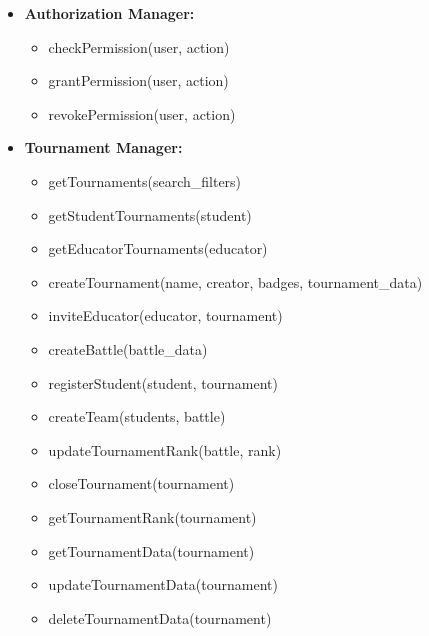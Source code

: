\begin{itemize}
    \item \textbf{Authorization Manager:}
    \begin{itemize}
        \item checkPermission(user, action)
        \item grantPermission(user, action)
        \item revokePermission(user, action)
    \end{itemize}

    \item \textbf{Tournament Manager:}
    \begin{itemize}
        \item getTournaments(search\_filters)
        \item getStudentTournaments(student)
        \item getEducatorTournaments(educator)
        \item createTournament(name, creator, badges, tournament\_data)
        \item inviteEducator(educator, tournament)
        \item createBattle(battle\_data)
        \item registerStudent(student, tournament)
        \item createTeam(students, battle)
        \item updateTournamentRank(battle, rank)
        \item closeTournament(tournament)
        \item getTournamentRank(tournament)
        \item getTournamentData(tournament)
        \item updateTournamentData(tournament)
        \item deleteTournamentData(tournament)
    \end{itemize}


\end{itemize}

